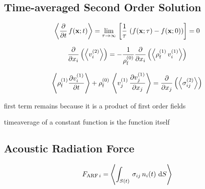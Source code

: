 \subsection{Time-averaged Second Order Solution\label{Th-avg-nd-order}}

\begin{equation}
  \left\langle \pdv{t}\,f(\vb{x};t) \right\rangle = \lim\limits_{\tau \rightarrow \infty}{\,
    \left[ \frac{1}{\tau}\,\left( f(\vb{x}; \tau) - f(\vb{x}; 0) \right) 
  \right]} = 0
  \label{eq:Th-avg-property}
\end{equation}


\begin{equation}
  \pdv{x_{i}}\left( \left\langle v_{i}^{(2)} \right\rangle \right) = 
  -\frac{1}{\rho_{\mathrm{f}}^{(0)}} \pdv{x_{i}}\left(\left\langle  
  \rho_{\mathrm{f}}^{(1)}\,v_{i}^{(1)}  \right\rangle\right)
  \label{eq:Th-avg-massconservatio}
\end{equation}

\begin{equation}
  \left\langle \rho_{\mathrm{f}}^{(1)} \pdv{  v_{i}^{(1)}  }{t} \right\rangle + 
  \rho_{\mathrm{f}}^{(0)}\,\left\langle v_{j}^{(1)}\,\pdv{  v_{j}^{(1)}  }{x_{j}} \right\rangle 
  = \pdv{x_{j}}\left( \left\langle \sigma_{ij}^{(2)} \right\rangle \right)
  \label{eq:Th-avg-navier}
\end{equation}

first term remains because it is a product of first order fields

timeaverage of a constant function is the function itself

\subsection{Acoustic Radiation Force\label{sec:Th-ARF}}

\begin{equation}
  F_{\mathrm{ARF}\,i} = \left\langle \int_{S(t)}\,\sigma_{ij}\,n_{i}(t)\,\dd{S} \right\rangle
  \label{eq:Th-def-ARF}
\end{equation}

